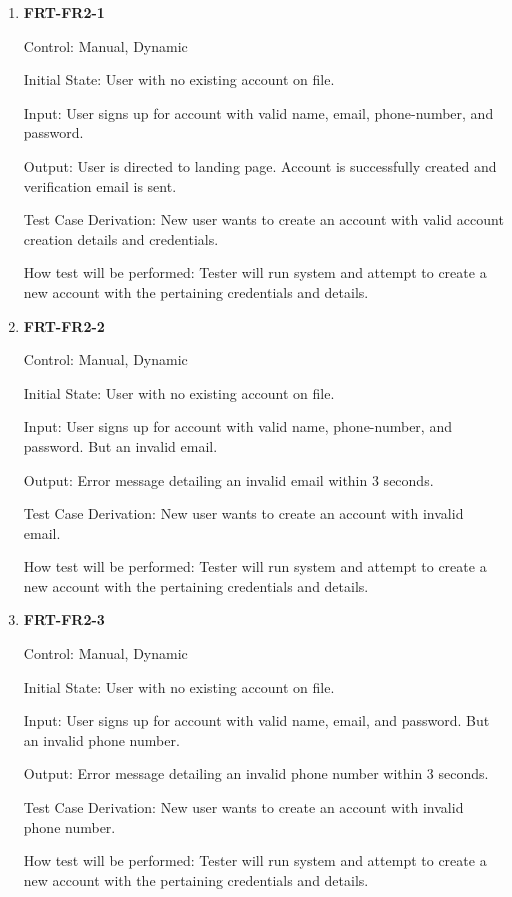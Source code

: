 \documentclass[12pt, titlepage]{article}
\begin{document}
\begin{enumerate}

\item{\textbf{FRT-FR2-1}}

Control: Manual, Dynamic
					
Initial State: User with no existing account on file.
					
Input: User signs up for account with valid name, email, phone-number, and password.
					
Output: User is directed to landing page. Account is successfully created and verification email is sent.

Test Case Derivation: New user wants to create an account with valid account creation details and credentials.
					
How test will be performed: Tester will run system and attempt to create a new account with the pertaining credentials and details. 
					
\item{\textbf{FRT-FR2-2}}

Control: Manual, Dynamic
					
Initial State: User with no existing account on file.
					
Input: User signs up for account with valid name, phone-number, and password. But an invalid email.
					
Output: Error message detailing an invalid email within 3 seconds.

Test Case Derivation: New user wants to create an account with invalid email.

How test will be performed: Tester will run system and attempt to create a new account with the pertaining credentials and details. 

\item{\textbf{FRT-FR2-3}}

Control: Manual, Dynamic
          
Initial State: User with no existing account on file.
          
Input: User signs up for account with valid name, email, and password. But an invalid phone number.
          
Output: Error message detailing an invalid phone number within 3 seconds.

Test Case Derivation: New user wants to create an account with invalid phone number.

How test will be performed: Tester will run system and attempt to create a new account with the pertaining credentials and details. 


\end{enumerate}
\end{document}
